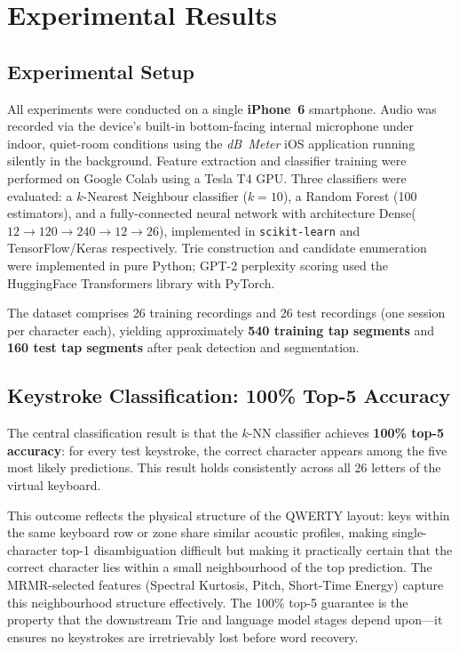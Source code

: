 \documentclass[conference]{IEEEtran}
\begin{document}
\section{Experimental Results}
\label{sec:results}

\subsection{Experimental Setup}

All experiments were conducted on a single \textbf{iPhone~6} smartphone. Audio was recorded via the device's built-in bottom-facing internal microphone under indoor, quiet-room conditions using the \textit{dB~Meter} iOS application running silently in the background. Feature extraction and classifier training were performed on Google Colab using a Tesla T4 GPU. Three classifiers were evaluated: a $k$-Nearest Neighbour classifier ($k{=}10$), a Random Forest (100 estimators), and a fully-connected neural network with architecture Dense($12 \to 120 \to 240 \to 12 \to 26$), implemented in \texttt{scikit-learn} and TensorFlow/Keras respectively. Trie construction and candidate enumeration were implemented in pure Python; GPT-2 perplexity scoring used the HuggingFace Transformers library with PyTorch.

The dataset comprises 26 training recordings and 26 test recordings (one session per character each), yielding approximately \textbf{540 training tap segments} and \textbf{160 test tap segments} after peak detection and segmentation.

\subsection{Keystroke Classification: 100\% Top-5 Accuracy}

The central classification result is that the $k$-NN classifier achieves \textbf{100\% top-5 accuracy}: for every test keystroke, the correct character appears among the five most likely predictions. This result holds consistently across all 26 letters of the virtual keyboard.

This outcome reflects the physical structure of the QWERTY layout: keys within the same keyboard row or zone share similar acoustic profiles, making single-character top-1 disambiguation difficult but making it practically certain that the correct character lies within a small neighbourhood of the top prediction. The MRMR-selected features (Spectral Kurtosis, Pitch, Short-Time Energy) capture this neighbourhood structure effectively. The 100\% top-5 guarantee is the property that the downstream Trie and language model stages depend upon---it ensures no keystrokes are irretrievably lost before word recovery.
\end{document}

